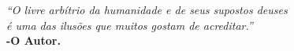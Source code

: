 \begin{epigrafe}
	\vspace*{\fill}
	\begin{flushright}
		\textit{``O livre arbítrio da humanidade e de seus supostos deuses \\é uma das  ilusões que muitos gostam de acreditar.''}\\
		\textbf{-O Autor.}
	\end{flushright}
\end{epigrafe}